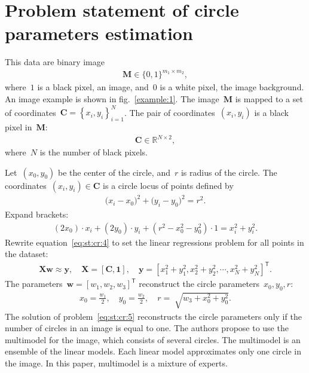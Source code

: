 \documentclass[12pt, twoside]{article}
\numberwithin{equation}{section}
\begin{document}
\section{Problem statement of circle parameters estimation}
This data are binary image
\[
\label{eq:st:cr:1}
\begin{aligned}
\textbf{M} \in \{0,1\}^{m_1 \times m_2},
\end{aligned}
\]
where~$1$ is a black pixel, an image, and~$0$ is a white pixel, the image background. 
An image example is shown in fig.~\ref{example:1}.
The image~$\textbf{M}$ is mapped to a set of coordinates~$\textbf{C}=\left\{x_i, y_i\right\}_{i=1}^{N}$. The pair of coordinates~$(x_i, y_i)$ is a black pixel in~$\textbf{M}$:
\[
\label{eq:st:cr:2}
\begin{aligned}
\textbf{C} \in  \mathbb{R}^{N \times 2},
\end{aligned}
\]
where~$N$ is the number of black pixels.

Let~$(x_0, y_0)$ be the center of the circle, and~$r$ is radius of the circle.
 The coordinates~$\left(x_i, y_i\right)\in\textbf{C}$ is a circle locus of points defined by
\[
\label{eq:st:cr:3}
\begin{aligned}
\bigr(x_i - x_0\bigr)^{2}+\bigr(y_i-y_0\bigr)^2 = r^2.
\end{aligned}
\]
Expand brackets:
\[
\label{eq:st:cr:4}
\begin{aligned}
\left(2x_0\right)\cdot x_i + \left(2y_0\right)\cdot y_i+\left(r^2-x_0^2-y_0^2\right)\cdot1 = x_{i}^2 + y_{i}^2.
\end{aligned}
\]
Rewrite equation~\eqref{eq:st:cr:4} to set the linear regressions problem for all points in the dataset:
\[
\label{eq:st:cr:5}
\begin{aligned}
\textbf{X}\textbf{w} \approx \textbf{y},  \quad \textbf{X} = \left[\textbf{C}, \textbf{1}\right], \quad \textbf{y} = \left[x_1^2+y_1^2, x_2^2+y_2^2, \cdots, x_N^2+y_N^2\right]^{\mathsf{T}}.
\end{aligned}
\]
The parameters~$\textbf{w} = \left[w_1, w_2, w_3\right]^{\mathsf{T}}$ reconstruct the circle parameters~$x_0, y_0, r$:
\[
\label{eq:st:cr:6}
\begin{aligned}
x_0 = \frac{w_1}{2}, \quad y_0 = \frac{w_2}{2}, \quad r = \sqrt[]{w_3+x_{0}^{2}+y_{0}^{2}}.
\end{aligned}
\]
The solution of problem~\eqref{eq:st:cr:5} reconstructs the circle parameters only if the number of circles in an image is equal to one.
The authors propose to use the multimodel for the image, which consists of several circles.
The multimodel is an ensemble of the linear models.
Each linear model approximates only one circle in the image.
In this paper, multimodel is a mixture of experts.
\end{document}

